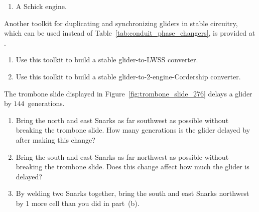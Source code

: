 \begin{multicols}{2}
\begin{problem}
\begin{enumerate}[label=\bf\color{ocre}(\alph*)]
			\item {} A Schick engine.
		\end{enumerate}
	\end{problem}


	\mfilbreak
	
	
	\begin{problem}\label{exer:other_toolkit_stable_conduits}
		Another toolkit for duplicating and synchronizing gliders in stable circuitry, which can be used instead of Table~\ref{tab:conduit_phase_changers}, is provided at . \smallskip
		
		\begin{enumerate}[label=\bf\color{ocre}(\alph*)]
			\item {} Use this toolkit to build a stable glider-to-LWSS converter.
			
			\item {} Use this toolkit to build a stable glider-to-2-engine-Cordership converter.
		\end{enumerate}
	\end{problem}


	\mfilbreak
	
	
	\begin{problemstar}\label{exer:faster_trombone_slide}
		The trombone slide displayed in Figure~\ref{fig:trombone_slide_276} delays a glider by $144$~generations.\smallskip
		
		\begin{enumerate}[label=\bf\color{ocre}(\alph*)]
			\item {} Bring the north and east Snarks as far southwest as possible without breaking the trombone slide. How many generations is the glider delayed by after making this change?
			
			\item {} Bring the south and east Snarks as far northwest as possible without breaking the trombone slide. Does this change affect how much the glider is delayed?
			
			\item {} By welding two Snarks together, bring the south and east Snarks northwest by 1 more cell than you did in part~(b).
		\end{enumerate}
	\end{problemstar}
	
	
	\mfilbreak
	

\end{multicols}
